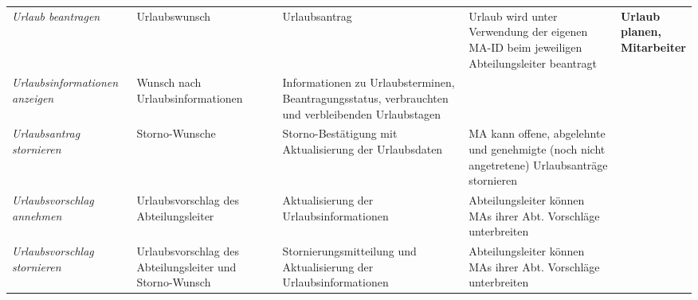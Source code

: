 {
\vspace{0,5cm}
\hspace{-3,5cm}
\footnotesize
\begin{tabular}{|p{3cm}|p{4cm}|p{4cm}|p{4cm}|p{2cm}|}
	\hline
		\textit{Urlaub beantragen} & 
		Urlaubswunsch & 
		Urlaubsantrag & 
		Urlaub wird unter Verwendung der eigenen MA-ID beim jeweiligen Abteilungsleiter beantragt & 
		\textbf{Urlaub \newline planen, \newline  Mitarbeiter } \\
	\cline{1-4}
		\textit{Urlaubsinformationen anzeigen} & 
		Wunsch nach Urlaubsinformationen & 
		Informationen zu Urlaubsterminen, Beantragungs\-status, verbrauchten und verbleibenden Urlaubstagen &  
		&  
		\\
	\cline{1-4}
		\textit{Urlaubsantrag \newline stornieren} &
		Storno-Wunsche &
		Storno-Best\"atigung mit Aktualisierung der Urlaubsdaten &
		MA kann offene, abgelehnte und genehmigte (noch nicht angetretene) Urlaubsantr\"age stornieren &
		\\
	\cline{1-4}
		\textit{Urlaubsvorschlag annehmen} &
		Urlaubsvorschlag des Abteilungsleiter &
		 Aktualisierung der Urlaubsinformationen &
		Abteilungsleiter k\"onnen MAs ihrer Abt. Vorschl\"age unterbreiten &
		\\
	\cline{1-4}
		\textit{Urlaubsvorschlag \newline stornieren} &
		Urlaubsvorschlag des Abteilungsleiter und Storno-Wunsch &
		Stornierungsmitteilung und Aktualisierung der Urlaubsinformationen &
		Abteilungsleiter k\"onnen MAs ihrer Abt. Vorschl\"age unterbreiten &
		\\
	\hline
\end{tabular}
}


